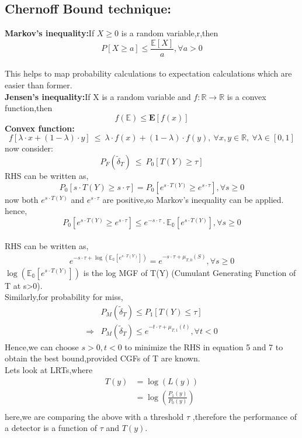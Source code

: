 \documentclass[a4paper,english,12pt]{article}
\begin{document}
 \subsection{Chernoff Bound technique:}
 \textbf{Markov's inequality:}If $X \geq 0$ is a random variable,r,then\\
 \[P[X\geq a]\leq \frac{\mathbb{E}[X]}{a},\forall a>0\]\\
 This helps to map probability calculations to expectation calculations which are easier than former.\\
 \textbf{Jensen's inequality:}If X is a random variable and $f:\mathbb{R}\rightarrow \mathbb{R}$ is a convex function,then
\[f(\mathbb{E})\leq \mathbf{E}[f(x)]\]
\textbf{Convex function:}
\[f[\lambda\cdot x+(1-\lambda)\cdot y]\ \leq\ \lambda\cdot f(x)+(1-\lambda)\cdot f(y),\ \forall x,y\in\mathbb{R},\ \forall \lambda \in [0,1]\]
now consider:\\
\[P_F(\tilde\delta_T)\ \leq\ P_0[T(Y)\geq\tau]\]
RHS can be written as,\\
\[P_0[s\cdot T(Y)\geq s\cdot\tau]=P_0[e^{s\cdot T(Y)}\geq e^{s\cdot\tau}],\forall s\geq 0\]
now both $e^{s\cdot T(Y)}$ and $e^{s\cdot\tau}$ are positive,so Markov's inequality can be applied.
hence,\\
\[P_0[e^{s\cdot T(Y)}\geq e^{s\cdot\tau}] \leq e^{-s\cdot\tau}\cdot\mathbb{E_0}[e^{s\cdot T(Y)}],\forall s\geq 0\]\\
RHS can be written as,
\begin{align}
e^{-s\cdot\tau+\log(\mathbb{E_0}[e^{s\cdot T(Y)}])}
= e^{-s\cdot\tau+\mu_{T,0}(S)},\forall s\geq 0
\end{align}
$\log(\mathbb{E_0}[e^{s\cdot T(Y)}])$ is the log MGF of T(Y) (Cumulant Generating Function of T at s>0).\\
Similarly,for probability for miss,
\begin{align}
&P_M(\tilde\delta_T)\leq P_1[T(Y)\leq\tau]\\
\Rightarrow &P_M(\tilde\delta_T)\leq e^{-t\cdot\tau +\mu_{T,1}(t)},\forall t<0
 \end{align}
Hence,we can choose $s>0,t<0$ to minimize the RHS in equation 5 and 7 to obtain the best bound,provided CGFs of T are known.\\
Lets look at LRTs,where
\begin{align*}
T(y)&=\log(L(y))\\
&=\log\left(\frac{P_1(y)}{P_0(y)}\right)\\
\end{align*}
here,we are comparing the above with a threshold $\tau$ ,therefore the performance of a detector is a function of $\tau$ and $T(y)$.\\
\end{document}
